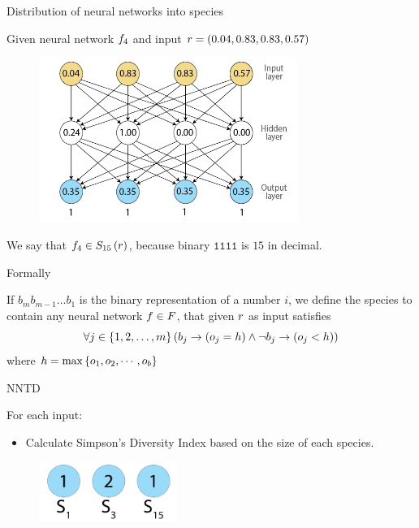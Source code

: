 \begin{frame}{Distribution of neural networks into species}
\begin{center}
Given neural network $f_4$ and input $r = (0.04, 0.83, 0.83, 0.57)$
  \begin{figure}[p]
  \includegraphics[width=0.75\textwidth]{images/nntdexample4.png}
  \end{figure}
We say that $f_4 \in S_{15}\left(r\right)$, because binary $\texttt{1111}$ is $15$ in decimal.
\end{center}
\end{frame}

\begin{frame}{Formally}
\begin{center}
If $b_{m}b_{m-1}\dots b_1$ is the binary representation of a number $i$, we define the species  to contain any neural network $f \in F$, that given $r$ as input satisfies
\begin{equation}
  \forall j \in \left\{ 1, 2, \dots, m \right\} \left(b_j \rightarrow (o_j = h) \wedge \neg b_j \rightarrow (o_j < h)\right)
\end{equation}
where $h = \max\left\{ o_1, o_2, \cdots, o_b \right\}$
\end{center}
\end{frame}

\begin{frame}{NNTD}
\begin{center}
For each input:
  \begin{itemize}
	  \item Calculate Simpson's Diversity Index based on the size of each species.
  \end{itemize}
     \begin{figure}[p]
  \includegraphics[width=0.4\textwidth]{images/speciessize.png}
  \end{figure}
\end{center}
\end{frame}

